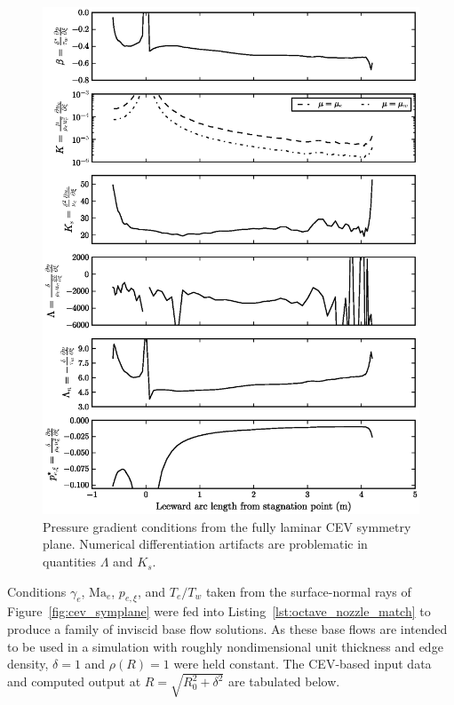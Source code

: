 \documentclass[letterpaper,11pt,nointlimits,reqno]{amsart}
\newcommand{\Mach}[1][]{\mbox{Ma}_{#1}}
\begin{document}
\begin{figure}[p]
  \centering
  \includegraphics[height=0.92\textheight]{cev_summary_fpg}
  \caption{
    \label{fig:cev_summary_fpg}
    Pressure gradient conditions from the fully laminar CEV symmetry plane.
    Numerical differentiation artifacts are problematic in quantities $\Lambda$
    and $K_s$.
  }
\end{figure}

Conditions $\gamma_e$, $\Mach[e]{}$, $p_{e,\xi}$, and $T_e/T_w$ taken from the
surface-normal rays of Figure~\ref{fig:cev_symplane} were fed into
Listing~\ref{lst:octave_nozzle_match} to produce a family of inviscid base flow
solutions. As these base flows are intended to be used in a simulation with
roughly nondimensional unit thickness and edge density, $\delta=1$ and
$\rho\!\left(R\right)=1$ were held constant.  The CEV-based input data and
computed output at $R=\sqrt{R_0^2+\delta^2}$ are tabulated below.
\end{document}
